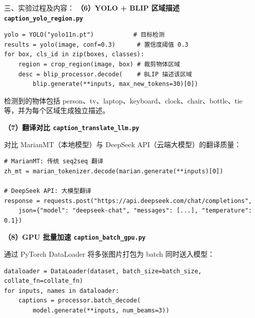 \documentclass[12pt, a4paper]{article}
\begin{document}
\begin{labbox}{三、实验过程及内容：}{}
\vspace{0.3cm}
\textbf{（6）YOLO + BLIP 区域描述 \texttt{caption\_yolo\_region.py}}

\begin{lstlisting}
yolo = YOLO("yolo11n.pt")           # 目标检测
results = yolo(image, conf=0.3)      # 置信度阈值 0.3
for box, cls_id in zip(boxes, classes):
    region = crop_region(image, box) # 裁剪物体区域
    desc = blip_processor.decode(    # BLIP 描述该区域
        blip.generate(**inputs, max_new_tokens=30)[0])
\end{lstlisting}

检测到的物体包括 person、tv、laptop、keyboard、clock、chair、bottle、tie 等，并为每个区域生成独立描述。

\vspace{0.3cm}
\textbf{（7）翻译对比 \texttt{caption\_translate\_llm.py}}

对比 MarianMT（本地模型）与 DeepSeek API（云端大模型）的翻译质量：

\begin{lstlisting}
# MarianMT: 传统 seq2seq 翻译
zh_mt = marian_tokenizer.decode(marian.generate(**inputs)[0])

# DeepSeek API: 大模型翻译
response = requests.post("https://api.deepseek.com/chat/completions",
    json={"model": "deepseek-chat", "messages": [...], "temperature": 0.1})
\end{lstlisting}

\vspace{0.3cm}
\textbf{（8）GPU 批量加速 \texttt{caption\_batch\_gpu.py}}

通过 PyTorch DataLoader 将多张图片打包为 batch 同时送入模型：

\begin{lstlisting}
dataloader = DataLoader(dataset, batch_size=batch_size, collate_fn=collate_fn)
for inputs, names in dataloader:
    captions = processor.batch_decode(
        model.generate(**inputs, num_beams=3))
\end{lstlisting}

\end{labbox}
\end{document}
